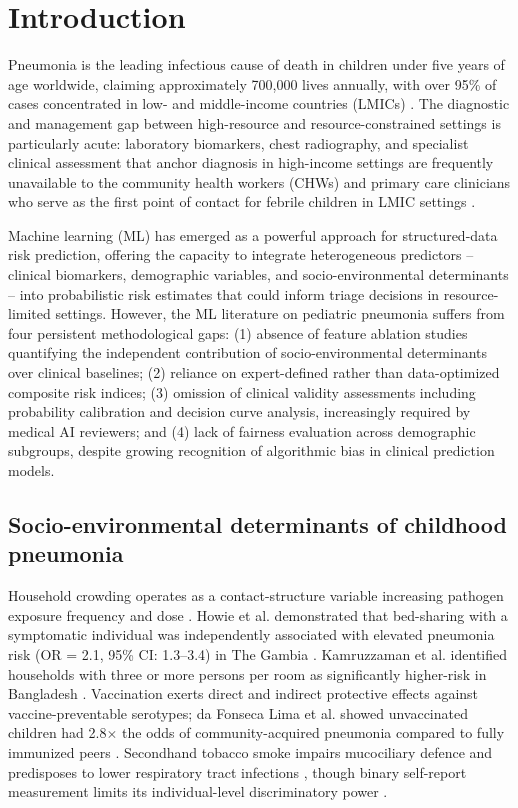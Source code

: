\documentclass[a4paper,fleqn]{cas-dc}
\begin{document}
\section{Introduction}
\label{sec:intro}

Pneumonia is the leading infectious cause of death in children under five years of age worldwide, claiming approximately 700,000 lives annually, with over 95\% of cases concentrated in low- and middle-income countries (LMICs) \cite{r1,r2,r3,r4}. The diagnostic and management gap between high-resource and resource-constrained settings is particularly acute: laboratory biomarkers, chest radiography, and specialist clinical assessment that anchor diagnosis in high-income settings are frequently unavailable to the community health workers (CHWs) and primary care clinicians who serve as the first point of contact for febrile children in LMIC settings \cite{r5,r6}.

Machine learning (ML) has emerged as a powerful approach for structured-data risk prediction, offering the capacity to integrate heterogeneous predictors -- clinical biomarkers, demographic variables, and socio-environmental determinants -- into probabilistic risk estimates that could inform triage decisions in resource-limited settings. However, the ML literature on pediatric pneumonia suffers from four persistent methodological gaps: (1) absence of feature ablation studies quantifying the independent contribution of socio-environmental determinants over clinical baselines; (2) reliance on expert-defined rather than data-optimized composite risk indices; (3) omission of clinical validity assessments including probability calibration and decision curve analysis, increasingly required by medical AI reviewers; and (4) lack of fairness evaluation across demographic subgroups, despite growing recognition of algorithmic bias in clinical prediction models.


\subsection{Socio-environmental determinants of childhood pneumonia}

Household crowding operates as a contact-structure variable increasing pathogen exposure frequency and dose \cite{r3,r7}. Howie et al. demonstrated that bed-sharing with a symptomatic individual was independently associated with elevated pneumonia risk (OR = 2.1, 95\% CI: 1.3--3.4) in The Gambia \cite{r8}. Kamruzzaman et al. identified households with three or more persons per room as significantly higher-risk in Bangladesh \cite{r3}. Vaccination exerts direct and indirect protective effects against vaccine-preventable serotypes; da Fonseca Lima et al. showed unvaccinated children had 2.8$\times$ the odds of community-acquired pneumonia compared to fully immunized peers \cite{r9}. Secondhand tobacco smoke impairs mucociliary defence and predisposes to lower respiratory tract infections \cite{r1,r3,r10}, though binary self-report measurement limits its individual-level discriminatory power \cite{r6,r10}.
\end{document}
